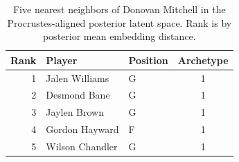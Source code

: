 \begin{table}[htbp]
  \centering\small
  \begin{tabular}{rllc}
    \toprule
    Rank & Player & Position & Archetype \\
    \midrule
    1 & Jalen Williams & G & 1 \\
    2 & Desmond Bane & G & 1 \\
    3 & Jaylen Brown & G & 1 \\
    4 & Gordon Hayward & F & 1 \\
    5 & Wilson Chandler & G & 1 \\
    \bottomrule
  \end{tabular}
  \caption{Five nearest neighbors of Donovan Mitchell in the Procrustes-aligned posterior latent space. Rank is by posterior mean embedding distance.}
  \label{tab:Donovan_Mitchell_neighbors}
\end{table}

